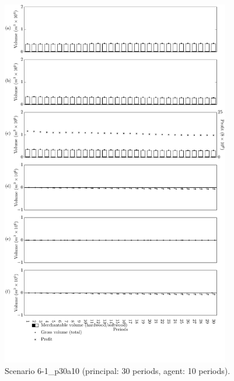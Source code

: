 \begin{figure}[h]
  \centering
  \includegraphics[width=10cm]{images/appendix/s6-1_p30a10}
  \caption{Scenario 6-1\_p30a10 (principal: 30 periods, agent: 10 periods).}
  \label{fig:s6-1_p30a10}
\end{figure}

